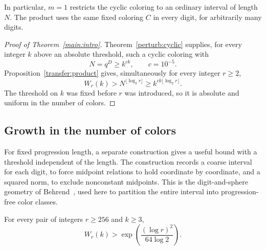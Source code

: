 In particular, $m=1$ restricts the cyclic coloring to an ordinary
interval of length $N$.  The product uses the same fixed coloring $C$
in every digit, for arbitrarily many digits.

\begin{proof}[Proof of Theorem~\ref{main:intro}]
Theorem~\ref{perturb:cyclic} supplies, for every integer $k$ above an
absolute threshold, such a cyclic coloring with
\[
 N=q^D\ge k^{ck},\qquad c=10^{-5}.
\]
Proposition~\ref{transfer:product} gives, simultaneously for every
integer $r\ge2$,
\[
 W_r(k)>N^{\lfloor\log_2r\rfloor}
 \ge k^{ck\lfloor\log_2r\rfloor}.
\]
The threshold on $k$ was fixed before $r$ was introduced, so it is
absolute and uniform in the number of colors.
\end{proof}

\subsection{Growth in the number of colors}

For fixed progression length, a separate construction gives a useful
bound with a threshold independent of the length.  The construction
records a coarse interval for each digit, to force midpoint relations
to hold coordinate by coordinate, and a squared norm, to exclude
nonconstant midpoints. This is the digit-and-sphere geometry of
Behrend~\cite{behrend1946}, used here to partition the entire interval
into progression-free color classes.

\begin{theorem}
\label{transfer:large-r}
For every pair of integers $r\ge256$ and $k\ge3$,
\[
 W_r(k)>\exp\!\left(\frac{(\log r)^2}{64\log2}\right).
\]
\end{theorem}

